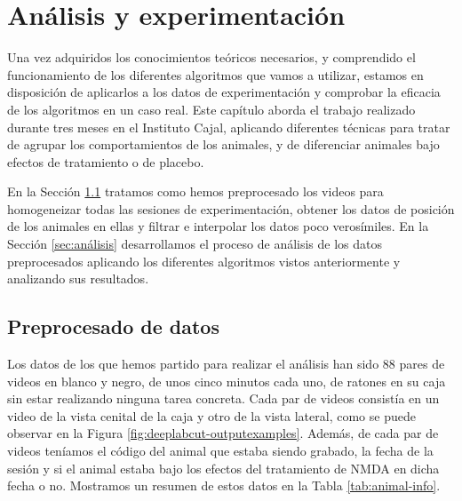 \chapter{Análisis y experimentación}
\label{chap:analisis-y-experimentacion}

Una vez adquiridos los conocimientos teóricos necesarios, y comprendido el funcionamiento de los diferentes algoritmos que vamos a utilizar, estamos en disposición de aplicarlos a los datos de experimentación y comprobar la eficacia de los algoritmos en un caso real. Este capítulo aborda el trabajo realizado durante tres meses en el Instituto Cajal, aplicando diferentes técnicas para tratar de agrupar los comportamientos de los animales, y de diferenciar animales bajo efectos de tratamiento o de placebo.

En la Sección \ref{sec:preprocesado} tratamos como hemos preprocesado los videos para homogeneizar todas las sesiones de experimentación, obtener los datos de posición de los animales en ellas y filtrar e interpolar los datos poco verosímiles. En la Sección \ref{sec:análisis} desarrollamos el proceso de análisis de los datos preprocesados aplicando los diferentes algoritmos vistos anteriormente y analizando sus resultados.

\section{Preprocesado de datos} \label{sec:preprocesado}

Los datos de los que hemos partido para realizar el análisis han sido 88 pares de videos en blanco y negro, de unos cinco minutos cada uno, de ratones en su caja sin estar realizando ninguna tarea concreta. Cada par de videos consistía en un video de la vista cenital de la caja y otro de la vista lateral, como se puede observar en la Figura \ref{fig:deeplabcut-outputexamples}. Además, de cada par de videos teníamos el código del animal que estaba siendo grabado, la fecha de la sesión y si el animal estaba bajo los efectos del tratamiento de NMDA en dicha fecha o no. Mostramos un resumen de estos datos en la Tabla \ref{tab:animal-info}.

